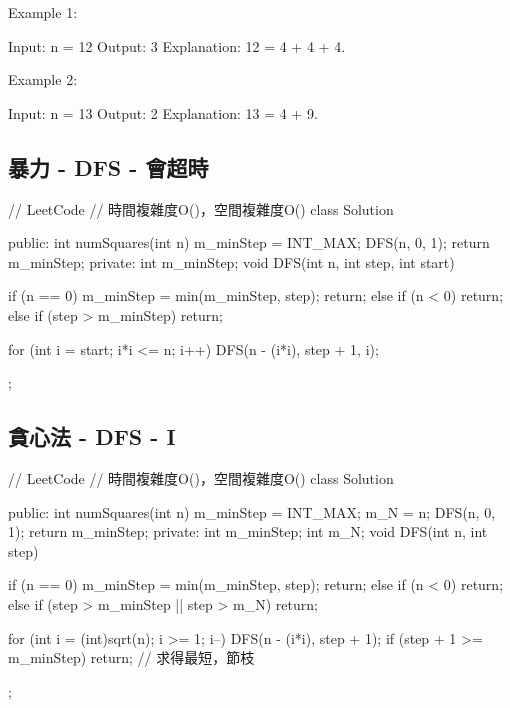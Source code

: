 Example 1:
\begin{Code}
Input: n = 12
Output: 3 
Explanation: 12 = 4 + 4 + 4.
\end{Code}

Example 2:
\begin{Code}
Input: n = 13
Output: 2
Explanation: 13 = 4 + 9.
\end{Code}


\subsection{暴力 - DFS - 會超時}
\begin{Code}
// LeetCode
// 時間複雜度O()，空間複雜度O()
class Solution {
public:
    int numSquares(int n) {
        m_minStep = INT_MAX;
        DFS(n, 0, 1);
        return m_minStep;
    }
private:
    int m_minStep;
    void DFS(int n, int step, int start)
    {
        if (n == 0)
        {
            m_minStep = min(m_minStep, step);
            return;
        }
        else if (n < 0)
            return;
        else if (step > m_minStep)
            return;

        for (int i = start; i*i <= n; i++)
        {
            DFS(n - (i*i), step + 1, i);
        }
    }
};
\end{Code}

\subsection{貪心法 - DFS - I}
\begin{Code}
// LeetCode
// 時間複雜度O()，空間複雜度O()
class Solution {
public:
    int numSquares(int n) {
        m_minStep = INT_MAX;
        m_N = n;
        DFS(n, 0, 1);
        return m_minStep;
    }
private:
    int m_minStep;
    int m_N;
    void DFS(int n, int step)
    {
        if (n == 0)
        {
            m_minStep = min(m_minStep, step);
            return;
        }
        else if (n < 0)
            return;
        else if (step > m_minStep || step > m_N)
            return;


        for (int i = (int)sqrt(n); i >= 1; i--)
        {
            DFS(n - (i*i), step + 1);
            if (step + 1 >= m_minStep) return; // 求得最短，節枝
        }
    }
};
\end{Code}

